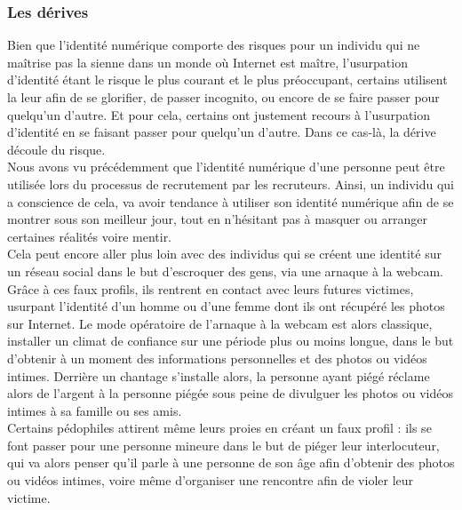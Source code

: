 \documentclass[12pt]{report}
\begin{document}
\newpage
\subsubsection{Les dérives}
Bien que l'identité numérique comporte des risques pour un individu qui ne maîtrise pas la sienne dans un monde où Internet est maître, l'usurpation d'identité étant le risque le plus courant et le plus préoccupant, certains utilisent la leur afin de se glorifier, de passer incognito, ou encore de se faire passer pour quelqu'un d'autre. Et pour cela, certains ont justement recours à l'usurpation d'identité en se faisant passer pour quelqu'un d'autre. Dans ce cas-là, la dérive découle du risque.\\

Nous avons vu précédemment que l'identité numérique d'une personne peut être utilisée lors du processus de recrutement par les recruteurs. Ainsi, un individu qui a conscience de cela, va avoir tendance à utiliser son identité numérique afin de se montrer sous son meilleur jour, tout en n'hésitant pas à masquer ou arranger certaines réalités voire mentir.\\

Cela peut encore aller plus loin avec des individus qui se créent une identité sur un réseau social dans le but d'escroquer des gens, via une arnaque à la webcam. Grâce à ces faux profils, ils rentrent en contact avec leurs futures victimes, usurpant l’identité d’un homme ou d’une femme dont ils ont récupéré les photos sur Internet. Le mode opératoire de l’arnaque à la webcam est alors classique, installer un climat de confiance sur une période plus ou moins longue,  dans le but d’obtenir à un moment des informations personnelles et des photos ou vidéos intimes. Derrière un chantage s'installe alors, la personne ayant piégé réclame alors de l'argent à la personne piégée sous peine de divulguer les photos ou vidéos intimes à sa famille ou ses amis.\\

Certains pédophiles attirent même leurs proies en créant un faux profil : ils se font passer pour une personne mineure dans le but de piéger leur interlocuteur, qui va alors penser qu'il parle à une personne de son âge afin d'obtenir des photos ou vidéos intimes, voire même d'organiser une rencontre afin de violer leur victime.
\end{document}
